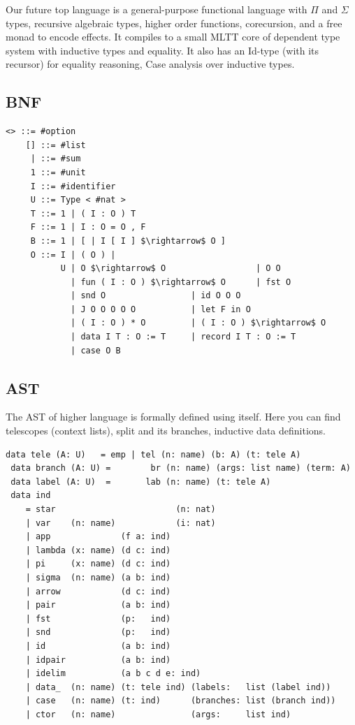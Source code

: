 \documentclass{aip-cp}
\begin{document}
Our future top language is a general-purpose functional language with $\Pi$ and $\Sigma$ types, recursive algebraic types, higher order functions, corecursion, and a free monad to encode effects.
It compiles to a small MLTT core of dependent type system with inductive types and equality.
It also has an Id-type (with its recursor) for equality reasoning, Case analysis over inductive types.

\subsection{BNF}

\begin{lstlisting}[mathescape=true]
    <> ::= #option
    [] ::= #list
     | ::= #sum
     1 ::= #unit
     I ::= #identifier
     U ::= Type < #nat >
     T ::= 1 | ( I : O ) T
     F ::= 1 | I : O = O , F
     B ::= 1 | [ | I [ I ] $\rightarrow$ O ]
     O ::= I | ( O ) |
           U | O $\rightarrow$ O                  | O O
             | fun ( I : O ) $\rightarrow$ O      | fst O
             | snd O                 | id O O O
             | J O O O O O           | let F in O
             | ( I : O ) * O         | ( I : O ) $\rightarrow$ O
             | data I T : O := T     | record I T : O := T
             | case O B
\end{lstlisting}

\subsection{AST}
The AST of higher language is formally defined using itself.
Here you can find telescopes (context lists), split and its branches, inductive data definitions.

\begin{lstlisting}[mathescape=true]
 data tele (A: U)   = emp | tel (n: name) (b: A) (t: tele A)
 data branch (A: U) =        br (n: name) (args: list name) (term: A)
 data label (A: U)  =       lab (n: name) (t: tele A)
 data ind
    = star                        (n: nat)
    | var    (n: name)            (i: nat)
    | app              (f a: ind)
    | lambda (x: name) (d c: ind)
    | pi     (x: name) (d c: ind)
    | sigma  (n: name) (a b: ind)
    | arrow            (d c: ind)
    | pair             (a b: ind)
    | fst              (p:   ind)
    | snd              (p:   ind)
    | id               (a b: ind)
    | idpair           (a b: ind)
    | idelim           (a b c d e: ind)
    | data_  (n: name) (t: tele ind) (labels:   list (label ind))
    | case   (n: name) (t: ind)      (branches: list (branch ind))
    | ctor   (n: name)               (args:     list ind)
\end{lstlisting}
\end{document}
